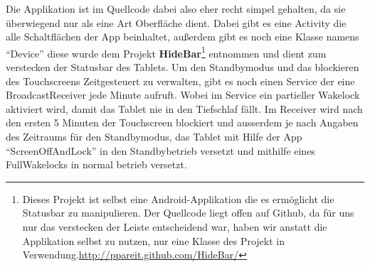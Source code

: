 \begin{flushleft}
Die Applikation ist im Quellcode dabei also eher recht simpel gehalten, da sie überwiegend nur als eine Art Oberfläche dient. Dabei gibt es eine Activity die alle Schaltflächen der App beinhaltet, außerdem gibt es noch eine Klasse namens ``Device'' diese wurde dem Projekt \textbf{HideBar}\footnote{Dieses Projekt ist selbst eine Android-Applikation die es ermöglicht die Statusbar zu manipulieren. Der Quellcode liegt offen auf Github, da für uns nur das verstecken der Leiste entscheidend war, haben wir anstatt die Applikation selbst zu nutzen, nur eine Klasse des Projekt in Verwendung.\url{http://ppareit.github.com/HideBar/}} entnommen und dient zum verstecken der Statusbar des Tablets. Um den Standbymodus und das blockieren des Touchscreens Zeitgesteuert zu verwalten, gibt es noch einen Service der eine BroadcastReceiver jede Minute aufruft. Wobei im Service ein partieller Wakelock aktiviert wird, damit das Tablet nie in den Tiefschlaf fällt. Im Receiver wird nach den ersten 5 Minuten der Touchscreen blockiert und ausserdem je nach Angaben des Zeitraums für den Standbymodus, das Tablet mit Hilfe der App ``ScreenOffAndLock'' in den Standbybetrieb versetzt und mithilfe eines FullWakelocks in normal betrieb versetzt.

\end{flushleft}